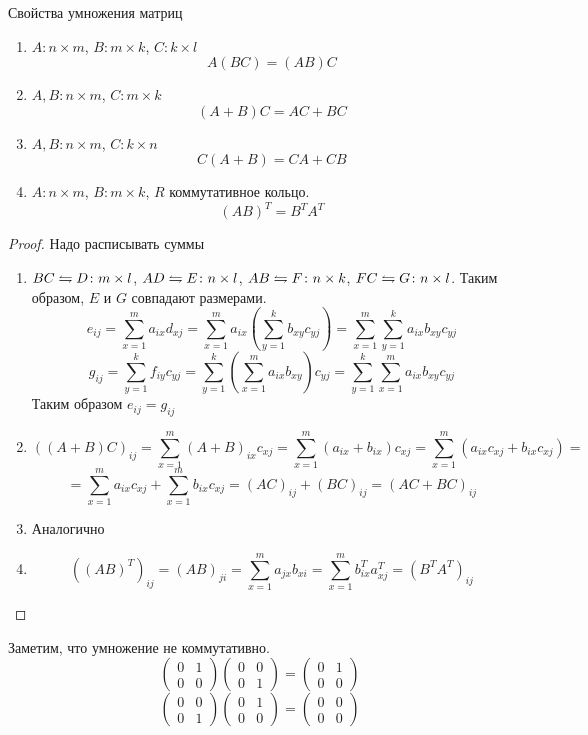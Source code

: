 \begin{theorem}{Свойства умножения матриц}
\begin{enumerate}
\item $A\colon n \times m$, $B\colon m \times k$, $C\colon k \times l$
$$A(BC) = (AB)C$$
\item $A, B\colon n \times m$, $C\colon m \times k$
$$(A+B)C = AC + BC$$
\item $A, B\colon n \times m$, $C\colon k \times n$
$$C(A + B) = CA + CB$$
\item $A\colon n \times m$, $B\colon m \times k$, $R$ коммутативное кольцо.
$$(AB)^T = B^TA^T$$
\end{enumerate}
\end{theorem}
\begin{proof}
Надо расписывать суммы
\begin{enumerate}
\item $BC \leftrightharpoons D\colon m \times l$, $AD \leftrightharpoons E\colon n \times l$, $AB \leftrightharpoons F\colon n \times k$, $FC \leftrightharpoons G\colon n \times l$. Таким образом, $E$ и $G$ совпадают размерами.
$$e_{ij} = \sum_{x=1}^m a_{ix} d_{xj} = \sum_{x=1}^m a_{ix} \left(\sum_{y=1}^k b_{xy} c_{yj}\right) = \sum_{x=1}^m \sum_{y=1}^k a_{ix} b_{xy} c_{yj}$$
$$g_{ij} = \sum_{y=1}^k f_{iy} c_{yj} = \sum_{y=1}^k \left(\sum_{x=1}^m a_{ix} b_{xy}\right) c_{yj} = \sum_{y=1}^k \sum_{x=1}^m a_{ix} b_{xy} c_{yj}$$
Таким образом $e_{ij} = g_{ij}$
\item
$$((A+B)C)_{ij} = \sum_{x=1}^m (A+B)_{ix} c_{xj} = \sum_{x=1}^m (a_{ix} + b_{ix}) c_{xj} = \sum_{x=1}^m (a_{ix} c_{xj} + b_{ix} c_{xj}) = $$
$$ = \sum_{x=1}^m a_{ix} c_{xj} + \sum_{x=1}^m b_{ix} c_{xj} = (AC)_{ij} + (BC)_{ij} = (AC+BC)_{ij}$$
\item Аналогично
\item
$$((AB)^T)_{ij} = (AB)_{ji} = \sum_{x=1}^m a_{jx} b_{xi} = \sum_{x=1}^m b^T_{ix} a^T_{xj} = (B^TA^T)_{ij}$$
\end{enumerate}
\end{proof}

Заметим, что умножение не коммутативно.
$$\left(\begin{matrix}0 & 1 \\ 0 & 0\end{matrix}\right) \left(\begin{matrix}0 & 0 \\ 0 & 1\end{matrix}\right) = \left(\begin{matrix}0 & 1 \\ 0 & 0\end{matrix}\right)$$
$$\left(\begin{matrix}0 & 0 \\ 0 & 1\end{matrix}\right) \left(\begin{matrix}0 & 1 \\ 0 & 0\end{matrix}\right) = \left(\begin{matrix}0 & 0 \\ 0 & 0\end{matrix}\right)$$

